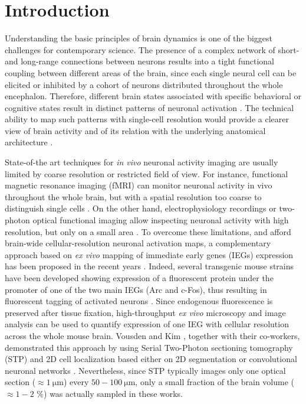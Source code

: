 \documentclass[smallextended]{svjour3}       %
\begin{document}
\section{Introduction}
\label{intro}
Understanding the basic principles of brain dynamics is one of the biggest challenges for contemporary
science. The presence of a complex network of short- and long-range connections between neurons
results into a tight functional coupling between different areas of the brain, since each single neural
cell can be elicited or inhibited by a cohort of neurons distributed throughout the whole encephalon.
Therefore, different brain states associated with specific behavioral or cognitive states result in
distinct patterns of neuronal activation \cite{alivisatos_brain_2012}. The technical ability to map such
patterns with single-cell resolution would provide a clearer view of brain activity and of its relation
with the underlying anatomical architecture \cite{oh_mesoscale_2014}.

State-of-the art techniques for \emph{in vivo} neuronal activity imaging are usually limited by coarse
resolution or restricted field of view. For instance, functional magnetic resonance imaging (fMRI) can
monitor neuronal activity in vivo throughout the whole brain, but with a spatial resolution too coarse
to distinguish single cells \cite{logothetis_what_2008}. On the other hand, electrophysiology recordings
or two-photon optical functional imaging allow inspecting neuronal activity with high resolution, but
only on a small area \cite{kerr_imaging_2008}. To overcome these limitations, and afford brain-wide
cellular-resolution neuronal activation maps, a complementary approach based on \emph{ex vivo} mapping
of immediate early genes (IEGs) expression has been proposed in the recent years
\cite{vousden_whole-brain_2014,kim_mapping_2015}. Indeed, several transgenic mouse strains have been developed
showing expression of a fluorescent protein under the promoter of one of the two main IEGs (Arc and
c-Fos), thus resulting in fluorescent tagging of activated neurons
\cite{barth_visualizing_2007,eguchi_vivo_2009,guenthner_permanent_2013}. Since endogenous fluorescence is
preserved after tissue fixation, high-throughput \emph{ex vivo} microscopy and image analysis can be
used to quantify expression of one IEG with cellular resolution across the whole mouse brain. Vousden
\cite{vousden_whole-brain_2014} and Kim \cite{kim_mapping_2015}, together with their co-workers, demonstrated
this approach by using Serial Two-Photon sectioning tomography (STP) \cite{ragan_serial_2012} and 2D
cell localization based either on 2D segmentation \cite{vousden_whole-brain_2014} or convolutional neuronal
networks \cite{kim_mapping_2015}. Nevertheless, since STP typically images only one optical section
($\approx \SI{1}{\micro\meter}$) every $50-\SI{100}{\micro\meter}$, only a small fraction of the
brain volume ($\approx 1-2$ \%) was actually sampled in these works.
\end{document}
